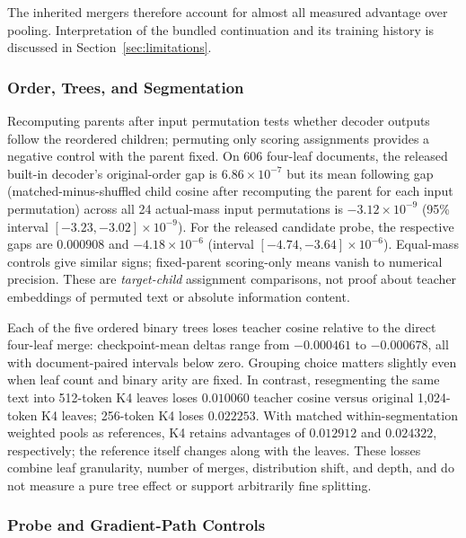 \documentclass[10pt]{article}
\begin{document}
The inherited mergers therefore account for almost all measured advantage over
pooling. Interpretation of the bundled continuation and its training history
is discussed in Section~\ref{sec:limitations}.

\subsubsection{Order, Trees, and Segmentation}
\label{sec:extended-structure-results}

Recomputing parents after input permutation tests whether decoder outputs
follow the reordered children; permuting only scoring assignments provides
a negative control with the parent fixed. On 606
four-leaf documents, the released built-in decoder's original-order gap is
\(6.86\times10^{-7}\) but its mean following gap (matched-minus-shuffled child cosine after
recomputing the parent for each input permutation) across all 24 actual-mass
input permutations is \(-3.12\times10^{-9}\) (95\% interval
\([-3.23,-3.02]\times10^{-9}\)). For the released candidate probe, the
respective gaps are \(0.000908\) and \(-4.18\times10^{-6}\) (interval
\([-4.74,-3.64]\times10^{-6}\)). Equal-mass controls give similar signs;
fixed-parent scoring-only means vanish to numerical precision. These are
\emph{target-child} assignment comparisons, not proof about teacher embeddings
of permuted text or absolute information content.

Each of the five ordered binary trees loses teacher cosine relative to the
direct four-leaf merge: checkpoint-mean deltas range from \(-0.000461\) to
\(-0.000678\), all with document-paired intervals below zero. Grouping choice
matters slightly even when leaf count and binary arity are fixed. In contrast,
resegmenting the same text into 512-token K4 leaves loses \(0.010060\)
teacher cosine versus original 1,024-token K4 leaves; 256-token K4 loses
\(0.022253\). With matched within-segmentation weighted pools as references,
K4 retains advantages of \(0.012912\) and \(0.024322\), respectively;
the reference itself changes along with the leaves. These losses combine
leaf granularity, number of merges, distribution shift, and depth, and do not
measure a pure tree effect or support arbitrarily fine splitting.

\subsubsection{Probe and Gradient-Path Controls}
\label{sec:extended-probe-results}
\end{document}
